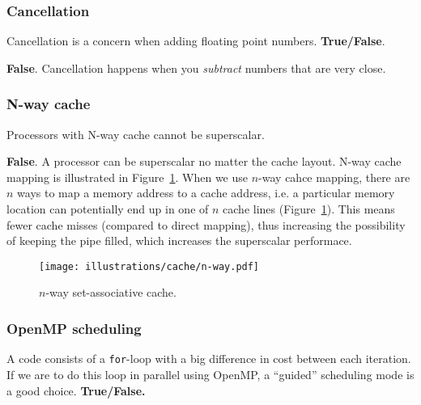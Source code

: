 \subsubsection{Cancellation} %
\label{ssub:cancellation}


\begin{question}
  Cancellation is a concern when adding floating point numbers. \textbf{True/False}.
\end{question}

\textbf{False}. Cancellation happens when you \emph{subtract} numbers that are very close.

\subsubsection{N-way cache} %
\label{ssub:n_way_cache}


\begin{question}
  Processors with N-way cache cannot be superscalar.
\end{question}
\textbf{False}. A processor can be superscalar no matter the cache layout. N-way cache mapping is illustrated in Figure~\ref{fig:nway}. When we use $n$-way cahce mapping, there are $n$ ways to map a memory address to a cache address, i.e. a particular memory location can potentially end up in one of $n$ cache lines (Figure~\ref{fig:nway}). This means fewer cache misses (compared to direct mapping), thus increasing the possibility of keeping the pipe filled, which increases the superscalar performace.

\begin{figure}[htbp]
  \centering
  \texttt{[image: illustrations/cache/n-way.pdf]}
  \caption{$n$-way set-associative cache.}
  \label{fig:nway}
\end{figure}

\subsubsection{OpenMP scheduling} %
\label{ssub:openmp_scheduling}


\begin{question}
  A code consists of a \texttt{for}-loop with a big difference in cost between each iteration. If we are to do this loop in parallel using OpenMP, a ``guided'' scheduling mode is a good choice. \textbf{True/False.}
\end{question}

